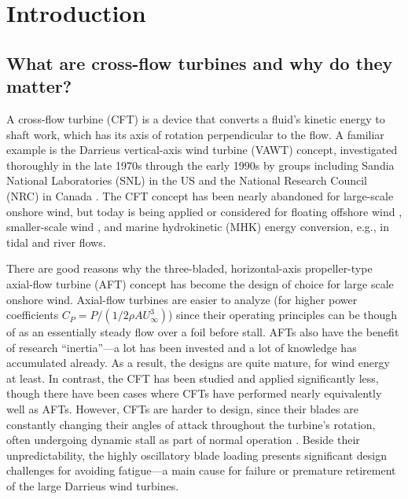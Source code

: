 \chapter{Introduction}


\section{What are cross-flow turbines and why do they matter?}

A cross-flow turbine (CFT) is a device that converts a fluid's kinetic energy to
shaft work, which has its axis of rotation perpendicular to the flow. A familiar
example is the Darrieus vertical-axis wind turbine (VAWT) concept, investigated
thoroughly in the late 1970s through the early 1990s by groups including Sandia
National Laboratories (SNL) in the US and the National Research Council (NRC) in
Canada \cite{Para2002}. The CFT concept has been nearly abandoned for
large-scale onshore wind, but today is being applied or considered for floating
offshore wind \cite{Sandia2012, Paulsen2011}, smaller-scale wind
\cite{Giges2012}, and marine hydrokinetic (MHK) energy conversion, e.g., in
tidal and river flows.

There are good reasons why the three-bladed, horizontal-axis propeller-type
axial-flow turbine (AFT) concept has become the design of choice for large scale
onshore wind. Axial-flow turbines are easier to analyze (for higher power
coefficients $C_P = P/(1/2 \rho A U_\infty^3)$) since their operating principles
can be though of as an essentially steady flow over a foil before stall. AFTs
also have the benefit of research ``inertia''---a lot has been invested and a
lot of knowledge has accumulated already. As a result, the designs are quite
mature, for wind energy at least. In contrast, the CFT has been studied and
applied significantly less, though there have been cases where CFTs have
performed nearly equivalently well as AFTs. However, CFTs are harder to design,
since their blades are constantly changing their angles of attack throughout the
turbine's rotation, often undergoing dynamic stall as part of normal operation
\cite{Para2002}. Beside their unpredictability, the highly oscillatory blade
loading presents significant design challenges for avoiding fatigue---a main
cause for failure or premature retirement of the large Darrieus wind turbines.

